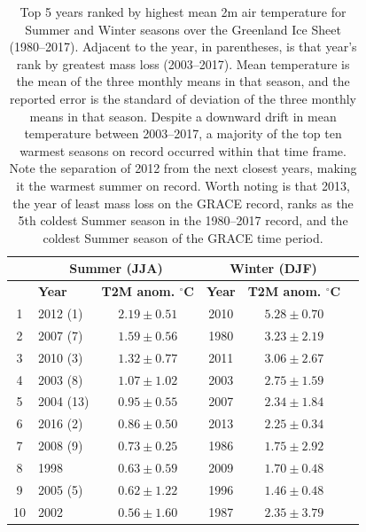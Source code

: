 \documentclass[11pt]{report}
\begin{document}
\begin{table}[!h]
\begin{center}
\begin{tabular}{ |c|l|c||c|c|c| } 
\hline
 & \multicolumn{2}{c}{\bfseries{Summer (JJA)}} & \multicolumn{2}{c|}{\bfseries{Winter (DJF)}} \\
\hline
 & \bfseries{Year} & \bfseries{T2M anom. $^{\circ}$C} & \bfseries{Year} & \bfseries{T2M anom. $^{\circ}$C}\\
\hline
1	& 	2012 (1)	&	$2.19 \pm 0.51$ &	2010	&	$5.28  \pm 0.70$	\\
2	&   2007 (7)	&	$1.59 \pm 0.56$ &	1980	&	$3.23  \pm 2.19$	\\
3	&   2010 (3)	&	$1.32 \pm 0.77$ &	2011	&	$3.06  \pm 2.67$	\\
4	&   2003 (8)	&	$1.07 \pm 1.02$ &	2003	&	$2.75  \pm 1.59$	\\
5	&   2004 (13)	&	$0.95 \pm 0.55$ &	2007	&	$2.34  \pm 1.84$	\\
6	&   2016 (2) 	&	$0.86 \pm 0.50$ &	2013	&	$2.25  \pm 0.34$	\\
7	&   2008 (9)	&	$0.73 \pm 0.25$ &	1986	&	$1.75  \pm 2.92$	\\
8	&   1998 		&	$0.63 \pm 0.59$ &	2009	&	$1.70  \pm 0.48$	\\
9	&   2005 (5)	&	$0.62 \pm 1.22$ &	1996	&	$1.46  \pm 0.48$	\\
10	&   2002		&	$0.56 \pm 1.60$ &	1987	&	$2.35  \pm 3.79$	\\
\hline
\end{tabular}
\caption[Warmest seasons over Greenland Ice Sheet]{Top 5 years ranked by highest mean 2m air temperature for Summer and Winter seasons over the Greenland Ice Sheet (1980--2017). Adjacent to the year, in parentheses, is that year's rank by greatest mass loss (2003--2017). Mean temperature is the mean of the three monthly means in that season, and the reported error is the standard of deviation of the three monthly means in that season. Despite a downward drift in mean temperature between 2003--2017, a majority of the top ten warmest seasons on record occurred within that time frame. Note the separation of 2012 from the next closest years, making it the warmest summer on record. Worth noting is that 2013, the year of least mass loss on the GRACE record, ranks as the 5th coldest Summer season in the 1980--2017 record, and the coldest Summer season of the GRACE time period. \label{tab:rankedseasons}}
\end{center}
\end{table}
\end{document}
